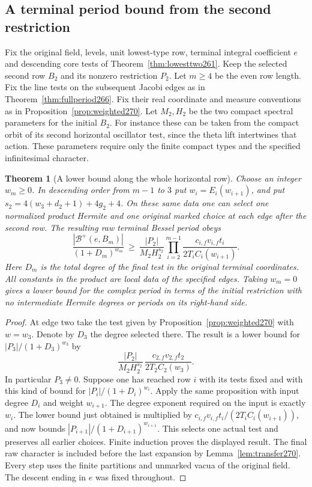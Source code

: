 \documentclass[a4paper,11pt]{article}
\newtheorem{theorem}[proposition]{Theorem}
\theoremstyle{definition}
\theoremstyle{remark}
\numberwithin{equation}{section}
\begin{document}
\subsection{A terminal period bound from the second restriction}\label{nav:V-40}
Fix the original field, levels, unit lowest-type row,
terminal integral coefficient \(e\) and descending core
tests of Theorem~\ref{thm:lowesttwo261}. Keep the selected
second row \(B_2\) and its nonzero restriction \(P_2\).
Let \(m\ge4\) be the even row length. Fix the line tests on
the subsequent Jacobi edges as in Theorem~\ref{thm:fullperiod266}.
Fix their real coordinate and measure conventions as in
Proposition~\ref{prop:weighted270}. Let \(M_2,H_2\) be the
two compact spectral parameters for the initial \(B_2\).
For instance these can be taken from the compact orbit of
its second horizontal oscillator test, since the theta lift
intertwines that action. These parameters require only the
finite compact types and the specified infinitesimal character.

\begin{theorem}[A lower bound along the whole horizontal row]\leavevmode
\label{thm:period270}
Choose an integer \(w_m\ge0\). In descending order from
\(m-1\) to \(3\) put \(w_i=E_i(w_{i+1})\), and put
\(s_2=4(w_3+d_2+1)+4g_2+4\).
On these same data one can select one normalized product
Hermite and one original marked choice at each edge after
the second row. The resulting raw terminal Bessel period
obeys
\[
 \frac{|\mathcal B^+(e,B_m)|}{(1+D_m)^{w_m}}
 \ \ge\
 \frac{|P_2|}{M_2 H_2^{s_2}}
       \prod_{i=2}^{m-1}
       \frac{c_{i,f}v_{i,f}t_i}{2 T_i C_i(w_{i+1})}.
\]
Here \(D_m\) is the total degree of the final test in the
original terminal coordinates. All constants in the product
are local data of the specified edges. Taking \(w_m=0\)
gives a lower bound for the complex period in terms of the
initial restriction with no intermediate Hermite degrees
or periods on its right-hand side.
\end{theorem}
\begin{proof}
At edge two take the test given by
Proposition~\ref{prop:weighted270} with \(w=w_3\).
Denote by \(D_3\) the degree selected there. The result is
a lower bound for \(|P_3|/(1+D_3)^{w_3}\) by
\[
       \frac{|P_2|}{M_2H_2^{s_2}}\,
       \frac{c_{2,f}v_{2,f}t_2}{2T_2 C_2(w_3)} .
\]
In particular \(P_3\ne0\). Suppose one has reached row
\(i\) with its tests fixed and with this kind of bound for
\(|P_i|/(1+D_i)^{w_i}\). Apply the same proposition with
input degree \(D_i\) and weight \(w_{i+1}\). The degree
exponent required on the input is exactly \(w_i\).
The lower bound just obtained is multiplied by
\(c_{i,f}v_{i,f}t_i/(2T_i C_i(w_{i+1}))\), and now bounds
\(|P_{i+1}|/(1+D_{i+1})^{w_{i+1}}\). This selects one actual
test and preserves all earlier choices. Finite induction
proves the displayed result. The final raw character is
included before the last expansion by Lemma~\ref{lem:transfer270}.
Every step uses the finite partitions and unmarked vacua of
the original field. The descent ending in \(e\) was fixed
throughout.
\end{proof}
\end{document}
